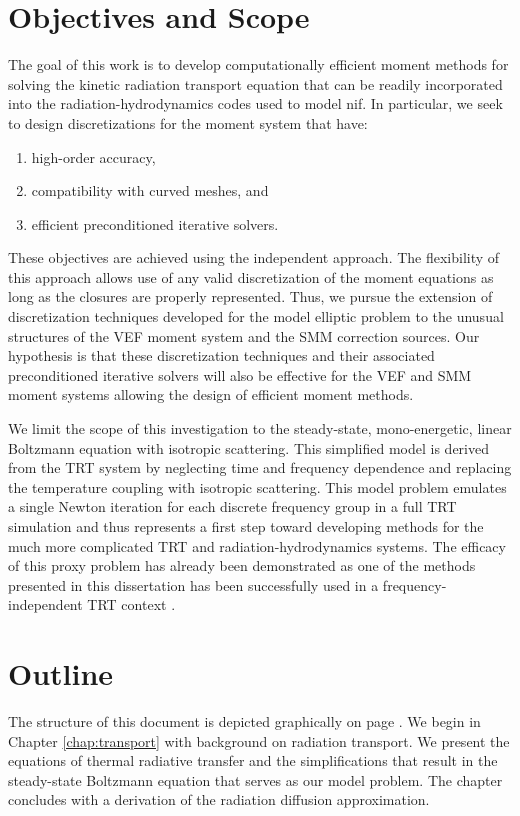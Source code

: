 \documentclass[../doc.tex]{subfiles}
\begin{document}
\section{Objectives and Scope}
The goal of this work is to develop computationally efficient moment methods for solving the kinetic radiation transport equation that can be readily incorporated into the radiation-hydrodynamics codes used to model \gls{nif}. In particular, we seek to design discretizations for the moment system that have: 
	\begin{enumerate}
		\item high-order accuracy, 
		\item compatibility with curved meshes, and
		\item efficient preconditioned iterative solvers. 
	\end{enumerate}
These objectives are achieved using the independent approach. The flexibility of this approach allows use of any valid discretization of the moment equations as long as the closures are properly represented. Thus, we pursue the extension of discretization techniques developed for the model elliptic problem to the unusual structures of the VEF moment system and the SMM correction sources. Our hypothesis is that these discretization techniques and their associated preconditioned iterative solvers will also be effective for the VEF and SMM moment systems allowing the design of efficient moment methods. 

We limit the scope of this investigation to the steady-state, mono-energetic, linear Boltzmann equation with isotropic scattering. This simplified model is derived from the TRT system by neglecting time and frequency dependence and replacing the temperature coupling with isotropic scattering. This model problem emulates a single Newton iteration for each discrete frequency group in a full TRT simulation and thus represents a first step toward developing methods for the much more complicated TRT and radiation-hydrodynamics systems. The efficacy of this proxy problem has already been demonstrated as one of the methods presented in this dissertation has been successfully used in a frequency-independent TRT context \cite{yee_mc21}. 

\section{Outline}
The structure of this document is depicted graphically on page \pageref{preamble:interdependence}. 
We begin in Chapter \ref{chap:transport} with background on radiation transport. We present the equations of thermal radiative transfer and the simplifications that result in the steady-state Boltzmann equation that serves as our model problem. The chapter concludes with a derivation of the radiation diffusion approximation. 
\end{document}
